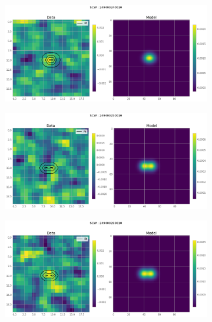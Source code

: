 \documentclass[
	a4paper, %
	10pt, %
	unnumberedsections, %
	twoside, %
]{LTJournalArticle}
\begin{document}
    \begin{figure}[H]
    \centering
    \begin{subfigure}{.47\textwidth}
        \centering
        \includegraphics[width=\textwidth]{report/Figures/models/2204/24_psf_const.png}
    \end{subfigure}
    \begin{subfigure}{.47\textwidth}
        \centering
        \includegraphics[width=\textwidth]{report/Figures/models/2204/25_psf_const.png}
    \end{subfigure}
    \hspace{1em}
    \begin{subfigure}{.47\textwidth}
        \includegraphics[width=\textwidth]{report/Figures/models/2204/26_psf_const.png}

\end{subfigure}
\end{figure}
\end{document}
